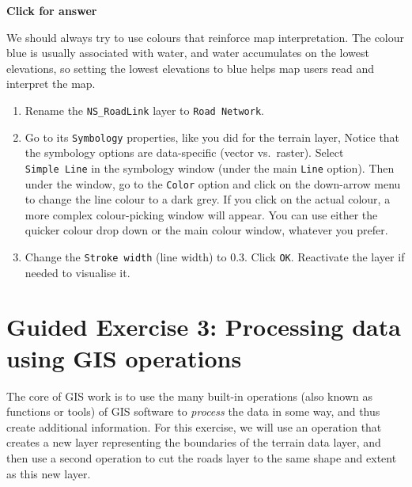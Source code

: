 \documentclass[
  letterpaper,
  DIV=11,
  numbers=noendperiod]{scrreprt}
\begin{document}
\begin{tcolorbox}[enhanced jigsaw, leftrule=.75mm, colframe=quarto-callout-important-color-frame, breakable, toprule=.15mm, bottomrule=.15mm, arc=.35mm, rightrule=.15mm, opacityback=0, colback=white, left=2mm]

\vspace{-3mm}\textbf{Click for answer}\vspace{3mm}

We should always try to use colours that reinforce map interpretation.
The colour blue is usually associated with water, and water accumulates
on the lowest elevations, so setting the lowest elevations to blue helps
map users read and interpret the map.

\end{tcolorbox}

\begin{enumerate}
\def\labelenumi{(\arabic{enumi})}
\setcounter{enumi}{27}
\item
  Rename the \texttt{NS\_RoadLink} layer to \texttt{Road\ Network}.
\item
  Go to its \texttt{Symbology} properties, like you did for the terrain
  layer, Notice that the symbology options are data-specific (vector
  vs.~raster). Select \texttt{Simple\ Line} in the symbology window
  (under the main \texttt{Line} option). Then under the window, go to
  the \texttt{Color} option and click on the down-arrow menu to change
  the line colour to a dark grey. If you click on the actual colour, a
  more complex colour-picking window will appear. You can use either the
  quicker colour drop down or the main colour window, whatever you
  prefer.
\item
  Change the \texttt{Stroke\ width} (line width) to 0.3. Click
  \texttt{OK}. Reactivate the layer if needed to visualise it.
\end{enumerate}

\section{Guided Exercise 3: Processing data using GIS
operations}\label{guided-exercise-3-processing-data-using-gis-operations}

The core of GIS work is to use the many built-in operations (also known
as functions or tools) of GIS software to \emph{process} the data in
some way, and thus create additional information. For this exercise, we
will use an operation that creates a new layer representing the
boundaries of the terrain data layer, and then use a second operation to
cut the roads layer to the same shape and extent as this new layer.
\end{document}

